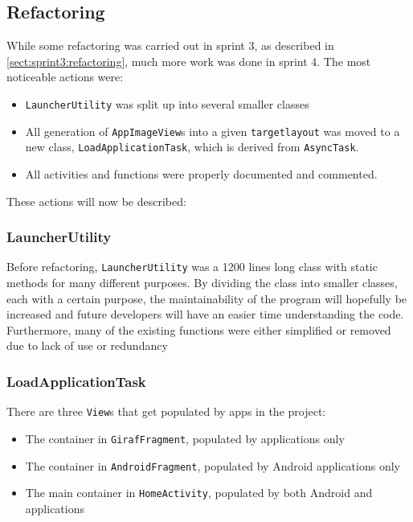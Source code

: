 \subsection{Refactoring}\label{sect:sprint4:refactoring}
While some refactoring was carried out in sprint 3, as described in \cref{sect:sprint3:refactoring}, much more work was done in sprint 4.
The most noticeable actions were:
\begin{itemize}
\item \lstinline!LauncherUtility! was split up into several smaller classes
\item All generation of \lstinline!AppImageView!s into a given \lstinline!targetlayout! was moved to a new class, \lstinline!LoadApplicationTask!, which is derived from \lstinline!AsyncTask!.
\item All activities and functions were properly documented and commented. 
\end{itemize}

These actions will now be described:

\subsubsection{LauncherUtility}
Before refactoring, \lstinline!LauncherUtility! was  a 1200 lines long class with static methods for many different purposes.
By dividing the class into smaller classes, each with a certain purpose, the maintainability of the program will hopefully be increased and future developers will have an easier time understanding the code.
Furthermore, many of the existing functions were either simplified or removed due to lack of use or redundancy

\subsubsection{LoadApplicationTask}
There are three \lstinline!View!s that get populated by apps in the \launcher project:

\begin{itemize}
\item The container in \lstinline!GirafFragment!, populated by \giraf applications only
\item The container in \lstinline!AndroidFragment!, populated by Android applications only
\item The main container in \lstinline!HomeActivity!, populated by both Android and \giraf applications
\end{itemize}

